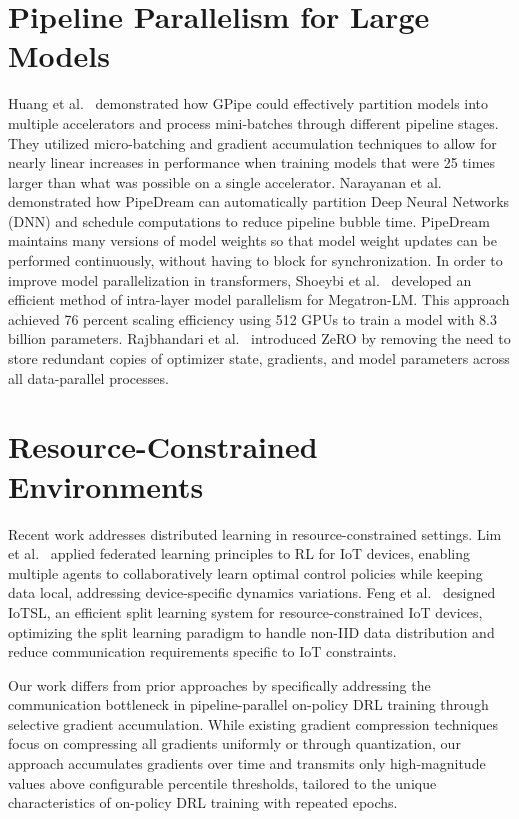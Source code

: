 \section{Pipeline Parallelism for Large Models}

Huang et al.~\cite{gpipe2019} demonstrated how GPipe could effectively partition models into multiple accelerators and process mini-batches through different pipeline stages. They utilized micro-batching and gradient accumulation techniques to allow for nearly linear increases in performance when training models that were 25 times larger than what was possible on a single accelerator. Narayanan et al.~\cite{pipedream2019} demonstrated how PipeDream can automatically partition Deep Neural Networks (DNN) and schedule computations to reduce pipeline bubble time. PipeDream maintains many versions of model weights so that model weight updates can be performed continuously, without having to block for synchronization. In order to improve model parallelization in transformers, Shoeybi et al.~\cite{megatron2019} developed an efficient method of intra-layer model parallelism for Megatron-LM. This approach achieved 76 percent scaling efficiency using 512 GPUs to train a model with 8.3 billion parameters. Rajbhandari et al.~\cite{zero2020} introduced ZeRO by removing the need to store redundant copies of optimizer state, gradients, and model parameters across all data-parallel processes.

\section{Resource-Constrained Environments}

Recent work addresses distributed learning in resource-constrained settings. Lim et al.~\cite{lim2020} applied federated learning principles to RL for IoT devices, enabling multiple agents to collaboratively learn optimal control policies while keeping data local, addressing device-specific dynamics variations. Feng et al.~\cite{feng2023} designed IoTSL, an efficient split learning system for resource-constrained IoT devices, optimizing the split learning paradigm to handle non-IID data distribution and reduce communication requirements specific to IoT constraints.

Our work differs from prior approaches by specifically addressing the communication bottleneck in pipeline-parallel on-policy DRL training through selective gradient accumulation. While existing gradient compression techniques focus on compressing all gradients uniformly or through quantization, our approach accumulates gradients over time and transmits only high-magnitude values above configurable percentile thresholds, tailored to the unique characteristics of on-policy DRL training with repeated epochs.

